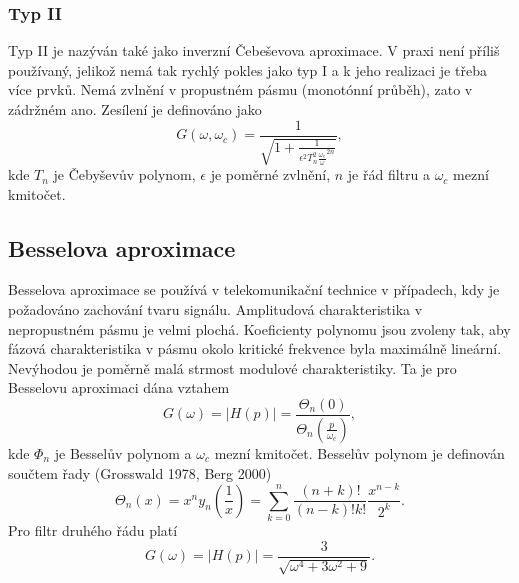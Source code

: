 \subsubsection{Typ II}
Typ II je nazýván také jako inverzní Čebeševova aproximace. V praxi není příliš používaný, jelikož nemá tak rychlý pokles jako typ I a k jeho realizaci je třeba více prvků. Nemá zvlnění v propustném pásmu (monotónní průběh), zato v zádržném ano. Zesílení je definováno jako
\begin{equation}
G(\omega, \omega _c) = \frac{1}{\sqrt{1 + \frac{1}{\epsilon ^2 T_n ^2 \frac{\omega _c}{\omega}^{2n}}}},
\end{equation}
kde $T_n$ je Čebyševův polynom, $\epsilon$ je poměrné zvlnění, $n$ je řád filtru a $\omega _c$ mezní kmitočet.
\subsection{Besselova aproximace}
Besselova aproximace se používá v telekomunikační technice v případech, kdy je požadováno zachování tvaru signálu. Amplitudová charakteristika v nepropustném pásmu je velmi plochá. Koeficienty polynomu jsou zvoleny tak, aby fázová charakteristika v pásmu okolo kritické frekvence byla maximálně lineární. Nevýhodou je poměrně malá strmost modulové charakteristiky. Ta je pro Besselovu aproximaci dána vztahem
\begin{equation}
G(\omega) = |H(p)| = \frac{\Theta _n(0)}{\Theta _n(\frac{p}{\omega _c})},
\end{equation}
kde $\Phi _n$ je Besselův polynom a $\omega _c$ mezní kmitočet. Besselův polynom je definován součtem řady (Grosswald 1978, Berg 2000)
\begin{equation}
\Theta _n (x) = x^n y_n (\frac{1}{x}) = \sum_{k=0}^{n}\frac{(n+k)!}{(n-k)!k!}\frac{x^{n-k}}{2^k}.
\end{equation}
Pro filtr druhého řádu platí
\begin{equation}
G(\omega) = |H(p)| = \frac{3}{\sqrt{\omega ^4 + 3\omega ^2 + 9}}.
\end{equation}
